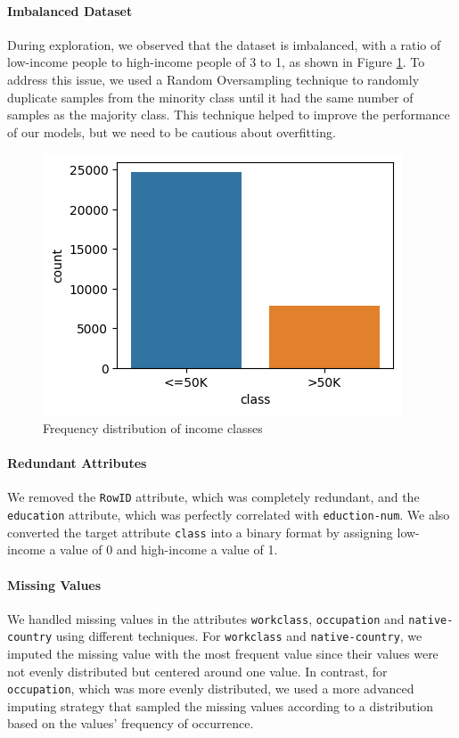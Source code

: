 \documentclass[twocolumn]{article}
\newcommand{\attr}[1]{\texttt{#1}}
\begin{document}
    \paragraph{Imbalanced Dataset}
    During exploration, we observed that the dataset is imbalanced,
    with a ratio of low-income people to high-income people of 3 to 1,
    as shown in Figure \ref{imbalance}.
    To address this issue, we used a Random Oversampling technique
    to randomly duplicate samples from the minority class
    until it had the same number of samples as the majority class.
    This technique helped to improve the performance of our models, but we need to be cautious about overfitting.

    \begin{figure}[htbp]
        \centerline{\includegraphics[width=0.7\columnwidth]{images/imbalance.png}}
        \caption{Frequency distribution of income classes}
        \label{imbalance}
    \end{figure}

    \paragraph{Redundant Attributes}
    We removed the \attr{RowID} attribute, which was completely redundant,
    and the \attr{education} attribute,
    which was perfectly correlated with \attr{eduction-num}.
    We also converted the target attribute \attr{class} into a binary format
    by assigning low-income a value of 0 and high-income a value of 1.

    \paragraph{Missing Values}
    We handled missing values in the attributes
    \attr{workclass}, \attr{occupation} and \attr{native-country}
    using different techniques.
    For \attr{workclass} and \attr{native-country}, we imputed the missing value with the most frequent value since their values were not evenly distributed but centered around one value. In contrast, for \attr{occupation}, which was more evenly distributed, we used a more advanced imputing strategy that sampled the missing values according to a distribution based on the values' frequency of occurrence.
\end{document}
